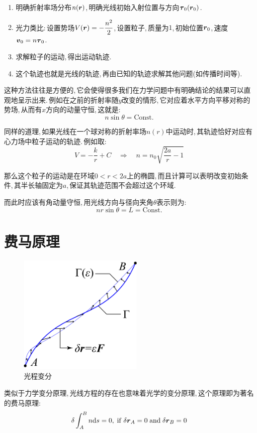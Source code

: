 \begin{enumerate}
	\item 明确折射率场分布\(n(\boldsymbol{r})\),\,明确光线初始入射位置与方向\(\boldsymbol{\tau}_0(\boldsymbol{r}_0)\).
	\item 光力类比:\,设置势场\(V(\boldsymbol{r})=-\dfrac{n^2}{2}\),\,设置粒子,\,质量为\(1\),\,初始位置\(\boldsymbol{r}_0\),\,速度\(\boldsymbol{v}_0=n\boldsymbol{\tau}_0\).
	\item 求解粒子的运动,\,得出运动轨迹.
	\item 这个轨迹也就是光线的轨迹,\,再由已知的轨迹求解其他问题(如传播时间等).
\end{enumerate}

这种方法往往是方便的,\,它会使得很多我们在力学问题中有明确结论的结果可以直观地呈示出来.\,例如在之前的折射率随\(y\)改变的情形,\,它对应着水平方向平移对称的势场,\,从而有\(x\)方向的动量守恒,\,这就是:
\[n\sin\theta=\mathrm{Const.}\]

同样的道理,\,如果光线在一个球对称的折射率场\(n(r)\)中运动时,\,其轨迹恰好对应有心力场中粒子运动的轨迹.\,例如取:
\[V=-\frac{k}{r}+C\quad\Rightarrow\quad n=n_0\sqrt{\frac{2a}{r}-1}\]

那么这个粒子的运动是在环域\(0<r<2a\)上的椭圆,\,而且计算可以表明改变初始条件,\,其半长轴固定为\(a\),\,保证其轨迹范围不会超过这个环域.

而此时应该有角动量守恒,\,用光线方向与径向夹角\(\theta\)表示则为:
\[nr\sin\theta=L=\mathrm{Const.}\]

\section{费马原理}
\begin{figure}
\centering
\includegraphics[width=6cm]{image/5-6-10.png}
\caption{光程变分}
\end{figure}
类似于力学变分原理,\,光线方程的存在也意味着光学的变分原理,\,这个原理即为著名的费马原理:
\[\delta\int_A^B n\textrm{d} s=0,\;{\rm if}\;\delta\boldsymbol{r}_A=0{\rm \; and \;}\delta\boldsymbol{r}_B=0\]

